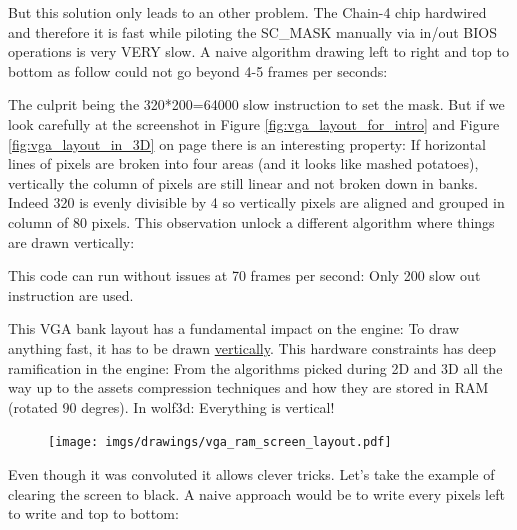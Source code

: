 \documentclass[book.tex]{subfiles}
\begin{document}
\par
But this solution only leads to an other problem. The Chain-4 chip hardwired and therefore it is fast while piloting the SC\_MASK manually via in/out BIOS operations is very VERY slow. A naive algorithm drawing left to right and top to bottom as follow could not go beyond 4-5 frames per seconds:\\
\par
\begin{minipage}{\textwidth}

\end{minipage}
\par
The culprit being the 320*200=64000 slow instruction to set the mask. But if we look carefully at the screenshot in Figure \ref{fig:vga_layout_for_intro} and Figure \ref{fig:vga_layout_in_3D} on page \pageref{fig:vga_layout_in_3D} there is an interesting property: If horizontal lines of pixels are broken into four areas (and it looks like mashed potatoes), vertically the column of pixels are still linear and not broken down in banks. Indeed 320 is evenly divisible by 4 so vertically pixels are aligned and grouped in column of 80 pixels. This observation unlock a different algorithm where things are drawn vertically:\\
\par

\begin{minipage}{\textwidth}

\end{minipage}

\par
This code can run without issues at 70 frames per second: Only 200 slow out instruction are used.\\
\par
This VGA bank layout has a fundamental impact on the engine: To draw anything fast, it has to be drawn \underline{vertically}. This hardware constraints has deep ramification in the engine: From the algorithms picked during 2D and 3D all the way up to the assets compression techniques and how they are stored in RAM (rotated 90 degres). In wolf3d: Everything is vertical!\\

\begin{figure}[H]
\centering
\texttt{[image: imgs/drawings/vga\_ram\_screen\_layout.pdf]}
\end{figure}

Even though it was convoluted it allows clever tricks. Let's take the example of clearing the screen to black. A naive approach would be to write every pixels left to write and top to bottom:\\
\par
\begin{minipage}{\textwidth}

\end{minipage}
\end{document}
